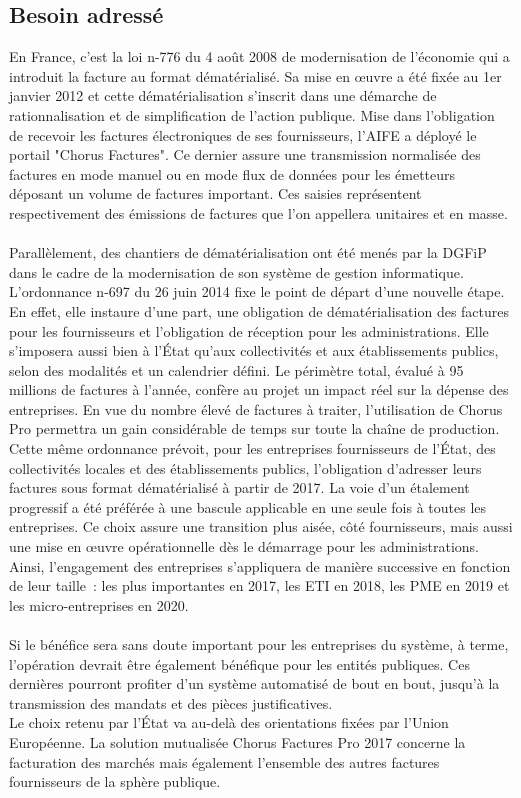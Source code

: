\documentclass[12pt,a4paper]{article}
\begin{document}
\subsection{Besoin adressé}
En France, c'est la loi n-776 du 4 août 2008 de modernisation de l'économie qui a introduit la facture au format dématérialisé. Sa mise en œuvre a été fixée au 1er janvier 2012 et cette dématérialisation s’inscrit dans une démarche de rationnalisation et de simplification de l’action publique. Mise dans l'obligation de recevoir les factures électroniques de ses fournisseurs, l'\gls{AIFE} a déployé le portail "Chorus Factures". Ce dernier assure une transmission normalisée des factures en mode manuel ou en mode flux de données pour les émetteurs déposant un volume de factures important. Ces saisies représentent respectivement des émissions de factures que l'on appellera unitaires et en masse.\\\\
Parallèlement, des chantiers de dématérialisation ont été menés par la \gls{DGFiP} dans le cadre de la modernisation de son système de gestion informatique.
L’ordonnance n-697 du 26 juin 2014 fixe le
point de départ d’une nouvelle étape. En effet, elle instaure d'une part, une obligation de dématérialisation des factures pour les fournisseurs et l'obligation de réception pour les administrations. Elle s'imposera aussi bien à l'État qu'aux collectivités et aux établissements publics, selon des modalités et un calendrier défini.
\smallbreak
Le périmètre total, évalué à 95 millions de factures à l'année, confère au projet un impact réel sur la dépense des entreprises. En vue du nombre élevé de factures à traiter, l'utilisation de Chorus Pro permettra un gain considérable de temps sur toute la chaîne de production.
\smallbreak
Cette même ordonnance prévoit, pour les entreprises fournisseurs de l'État, des collectivités locales et des établissements publics, l'obligation d'adresser leurs factures sous format dématérialisé à partir de 2017. La voie d'un étalement progressif a été préférée à une bascule applicable en une seule fois à toutes les entreprises. Ce choix assure une transition plus aisée, côté fournisseurs, mais aussi une mise en œuvre opérationnelle dès le démarrage pour les administrations. Ainsi, l'engagement des entreprises s'appliquera de manière successive en fonction de leur taille~: les plus importantes en 2017, les \gls{ETI} en 2018, les \gls{PME} en 2019 et les micro-entreprises en 2020.\\\\
Si le bénéfice sera sans doute important pour les entreprises du système, à terme, l'opération devrait être également bénéfique pour les entités publiques. Ces dernières pourront profiter d'un système automatisé de bout en bout, jusqu'à la transmission des mandats et des pièces justificatives.\\
Le choix retenu par l'État va au-delà des orientations fixées par l’Union Européenne. La solution mutualisée Chorus Factures Pro 2017 concerne la facturation des marchés mais également l'ensemble des autres factures fournisseurs de la sphère publique.
\newpage
\end{document}
